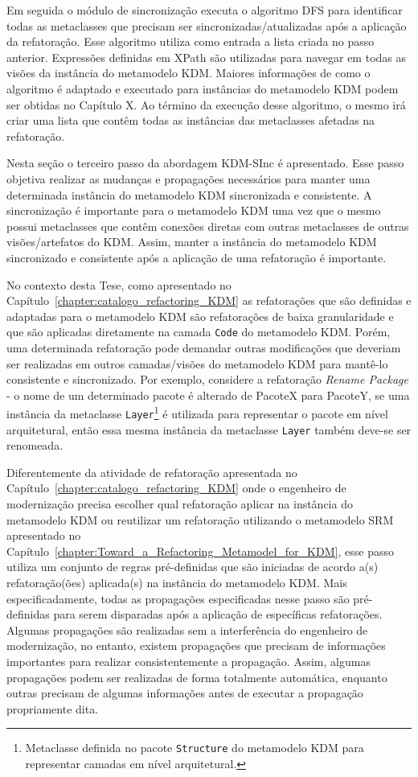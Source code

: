 Em seguida o módulo de sincronização executa o algoritmo DFS para identificar todas as metaclasses que precisam ser sincronizadas/atualizadas após a aplicação da refatoração. Esse algoritmo utiliza como entrada a lista criada no passo anterior. Expressões definidas em XPath são utilizadas para navegar em todas as visões da instância do metamodelo KDM. Maiores informações de como o algoritmo é adaptado e executado para instâncias do metamodelo KDM podem ser obtidas no Capítulo X. Ao término da execução desse algoritmo, o mesmo irá criar uma lista que contêm todas as instâncias das metaclasses afetadas na refatoração. 
   

Nesta seção o terceiro passo da abordagem KDM-SInc é apresentado. Esse passo objetiva realizar as mudanças e propagações necessários para manter uma determinada instância do metamodelo KDM sincronizada e consistente. A sincronização é importante para o metamodelo KDM uma vez que o mesmo possui metaclasses que contêm conexões diretas com outras metaclasses de outras visões/artefatos do KDM. Assim, manter a instância do metamodelo KDM sincronizado e consistente após a aplicação de uma refatoração é importante. 

No contexto desta Tese, como apresentado no Capítulo~\ref{chapter:catalogo_refactoring_KDM} as refatorações que são definidas e adaptadas para o metamodelo KDM são refatorações de baixa granularidade e que são aplicadas diretamente na camada \texttt{Code} do metamodelo KDM. Porém, uma determinada refatoração pode demandar outras modificações que deveriam ser realizadas em outros camadas/visões do metamodelo KDM para mantê-lo consistente e sincronizado. Por exemplo, considere a refatoração \textit{Rename Package} - o nome de um determinado pacote é alterado de PacoteX para PacoteY, se uma instância da metaclasse \texttt{Layer}\footnote{Metaclasse definida no pacote \texttt{Structure} do metamodelo KDM para representar camadas em nível arquitetural.} é utilizada para representar o pacote em nível arquitetural, então essa mesma instância da metaclasse \texttt{Layer} também deve-se ser renomeada. 

Diferentemente da atividade de refatoração apresentada no Capítulo~\ref{chapter:catalogo_refactoring_KDM} onde o engenheiro de modernização precisa escolher qual refatoração aplicar na instância do metamodelo KDM ou reutilizar um refatoração utilizando o metamodelo SRM apresentado no Capítulo~\ref{chapter:Toward_a_Refactoring_Metamodel_for_KDM}, esse passo utiliza um conjunto de regras pré-definidas que são iniciadas de acordo a(s) refatoração(ões) aplicada(s) na instância do metamodelo KDM. Mais especificadamente, todas as propagações especificadas nesse passo são pré-definidas para serem disparadas após a aplicação de específicas refatorações. Algumas propagações são realizadas sem a interferência do engenheiro de modernização, no entanto, existem propagações que precisam de informações importantes para realizar consistentemente a propagação. Assim, algumas propagações podem ser realizadas de forma totalmente automática, enquanto outras precisam de algumas informações antes de executar a propagação propriamente dita.

